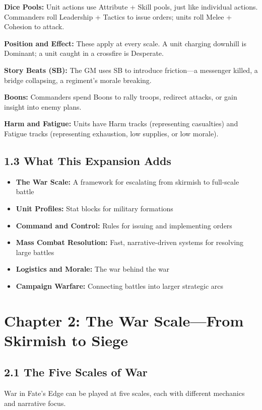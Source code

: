 \documentclass[11pt]{article}
\begin{document}
\textbf{Dice Pools:} Unit actions use Attribute + Skill pools, just like individual actions. Commanders roll Leadership + Tactics to issue orders; units roll Melee + Cohesion to attack.

\textbf{Position and Effect:} These apply at every scale. A unit charging downhill is Dominant; a unit caught in a crossfire is Desperate.

\textbf{Story Beats (SB):} The GM uses SB to introduce friction—a messenger killed, a bridge collapsing, a regiment's morale breaking.

\textbf{Boons:} Commanders spend Boons to rally troops, redirect attacks, or gain insight into enemy plans.

\textbf{Harm and Fatigue:} Units have Harm tracks (representing casualties) and Fatigue tracks (representing exhaustion, low supplies, or low morale).

\subsection{1.3 What This Expansion Adds}

\begin{itemize}
  \item \textbf{The War Scale:} A framework for escalating from skirmish to full-scale battle
  \item \textbf{Unit Profiles:} Stat blocks for military formations
  \item \textbf{Command and Control:} Rules for issuing and implementing orders
  \item \textbf{Mass Combat Resolution:} Fast, narrative-driven systems for resolving large battles
  \item \textbf{Logistics and Morale:} The war behind the war
  \item \textbf{Campaign Warfare:} Connecting battles into larger strategic arcs
\end{itemize}

\section{Chapter 2: The War Scale—From Skirmish to Siege}

\subsection{2.1 The Five Scales of War}

War in Fate's Edge can be played at five scales, each with different mechanics and narrative focus.
\end{document}
